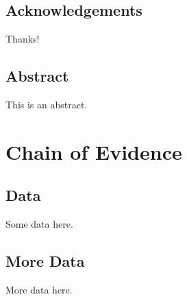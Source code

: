 \documentclass[12pt,oneside,letterpaper]{memoir}
\begin{document}
\frontmatter

\thetitlepage
\copyrightpage

\section*{Acknowledgements}
Thanks!

\newpage
\section*{Abstract}

This is an abstract.

\newpage
\tableofcontents
\listoftables
\listoffigures

\mainmatter




\appendix
\chapter{Chain of Evidence}
\label{AppendixChainOfEvidence}
\section{Data}
Some data here.
\section{More Data}
More data here.

\backmatter
\end{document}
